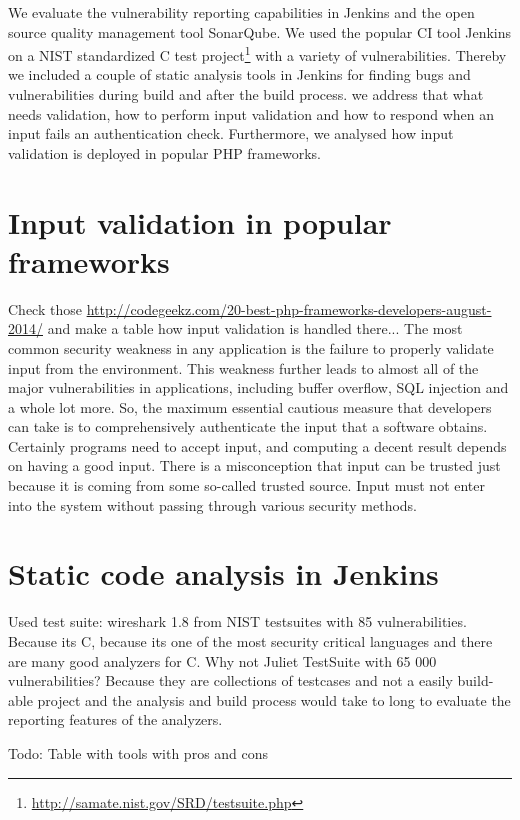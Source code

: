 \documentclass[conference]{IEEEtran}
\begin{document}
We evaluate the vulnerability reporting capabilities in Jenkins and the open source quality management tool SonarQube.
We used the popular CI tool Jenkins on a NIST standardized C test project\footnote{\url{http://samate.nist.gov/SRD/testsuite.php}} with a variety of vulnerabilities.
Thereby we included a couple of static analysis tools in Jenkins for finding bugs and vulnerabilities during build and after the build process.
we address that what needs validation, how to perform input validation and how to respond when an input fails an authentication check. Furthermore, we analysed how input validation is deployed in popular PHP frameworks.

\section{Input validation in popular frameworks}
\label{sec:input_validation}
Check those \url{http://codegeekz.com/20-best-php-frameworks-developers-august-2014/} and make a table how input validation is handled there...
The most common security weakness in any application is the failure to properly validate input from the environment. This weakness further leads to almost all of the major vulnerabilities in applications, including buffer overflow, SQL injection and a whole lot more. So, the maximum essential cautious measure that developers can take is to comprehensively authenticate the input that a software obtains. Certainly programs need to accept input, and computing a decent result depends on having a good input. There is a misconception that input can be trusted just because it is coming from some so-called trusted source. Input must not enter into the system without passing through various security methods.

\section{Static code analysis in Jenkins}
\label{sec:static_code_analysis_jenkins}
Used test suite: wireshark 1.8 from NIST testsuites with 85 vulnerabilities.
Because its C, because its one of the most security critical languages and there are many good analyzers for C.
Why not Juliet TestSuite with 65 000 vulnerabilities?
Because they are collections of testcases and not a easily build-able project and the analysis and build process would take to long to evaluate the reporting features of the analyzers.


Todo: Table with tools with pros and cons
\end{document}
